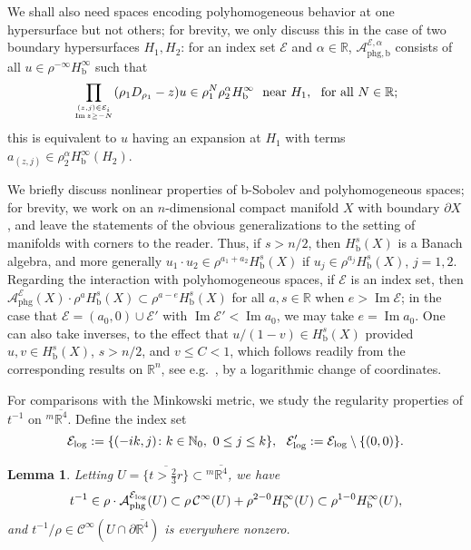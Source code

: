 \documentclass[reqno,11pt,letterpaper]{amsart}
\numberwithin{equation}{section}
\numberwithin{figure}{section}
\newtheorem{lemma}[thm]{Lemma}
\theoremstyle{definition}
\theoremstyle{remark}
\newcommand{\mc}{\mathcal}
\newcommand{\cA}{\mc A}
\newcommand{\cC}{\mc C}
\newcommand{\cE}{\mc E}
\newcommand{\N}{\mathbb{N}}
\newcommand{\R}{\mathbb{R}}
\renewcommand{\Im}{\operatorname{Im}}
\newcommand{\ol}{\overline}
\newcommand{\pa}{\partial}
\newcommand{\tn}{\textnormal}
\newcommand{\bop}{{\mathrm{b}}}
\newcommand{\CI}{\cC^\infty}
\newcommand{\Hb}{H_{\bop}}
\newcommand{\phg}{{\mathrm{phg}}}
\begin{document}
We shall also need spaces encoding polyhomogeneous behavior at one hypersurface but not others; for brevity, we only discuss this in the case of two boundary hypersurfaces $H_1,H_2$: for an index set $\cE$ and $\alpha\in\R$, $\cA^{\cE,\alpha}_{\phg,\bop}$ consists of all $u\in\rho^{-\infty}\Hb^\infty$ such that
\[
  \prod_{\genfrac{}{}{0pt}{}{(z,j)\in\cE_i}{\Im z\geq-N}} (\rho_1 D_{\rho_1}-z)u\in\rho_1^N\rho_2^\alpha\Hb^\infty\ \ \tn{near}\ H_1,\ \ \tn{for all}\ N\in\R;
\]
this is equivalent to $u$ having an expansion at $H_1$ with terms $a_{(z,j)}\in\rho_2^\alpha\Hb^\infty(H_2)$.

We briefly discuss nonlinear properties of b-Sobolev and polyhomogeneous spaces; for brevity, we work on an $n$-dimensional compact manifold $X$ with boundary $\pa X$, and leave the statements of the obvious generalizations to the setting of manifolds with corners to the reader. Thus, if $s>n/2$, then $\Hb^s(X)$ is a Banach algebra, and more generally $u_1\cdot u_2\in\rho^{a_1+a_2}\Hb^s(X)$ if $u_j\in\rho^{a_j}\Hb^s(X)$, $j=1,2$. Regarding the interaction with polyhomogeneous spaces, if $\cE$ is an index set, then $\cA_\phg^\cE(X)\cdot\rho^a\Hb^s(X)\subset\rho^{a-e}\Hb^s(X)$ for all $a,s\in\R$ when $e>\Im\cE$; in the case that $\cE=(a_0,0)\cup\cE'$ with $\Im\cE'<\Im a_0$, we may take $e=\Im a_0$. One can also take inverses, to the effect that $u/(1-v)\in\Hb^s(X)$ provided $u,v\in\Hb^s(X)$, $s>n/2$, and $v\leq C<1$, which follows readily from the corresponding results on $\R^n$, see e.g.\ \cite[\S13.10]{TaylorPDE}, by a logarithmic change of coordinates.

For comparisons with the Minkowski metric, we study the regularity properties of $t^{-1}$ on ${}^m\ol{\R^4}$. Define the index set
\begin{equation}
\label{EqCptIndexSetLog}
  \cE_{\rm log}:=\{(-i k,j)\colon k\in\N_0,\ 0\leq j\leq k\},\ \ 
  \cE'_{\rm log} := \cE_{\rm log}\setminus\{(0,0)\}.
\end{equation}

\begin{lemma}
\label{LemmaCptFtInv}
  Letting $U=\ol{\{t>\tfrac23 r\}}\subset{}^m\ol{\R^4}$, we have
  \begin{equation}
  \label{EqCptFtInvPhg}
    t^{-1} \in \rho\cdot\cA_\phg^{\cE_{\rm log}}(U) \subset \rho\,\CI(U)+\rho^{2-0}\Hb^\infty(U)\subset\rho^{1-0}\Hb^\infty(U),
  \end{equation}
  and $t^{-1}/\rho\in\CI(U\cap\pa\ol{\R^4})$ is everywhere nonzero.
\end{lemma}
\end{document}
